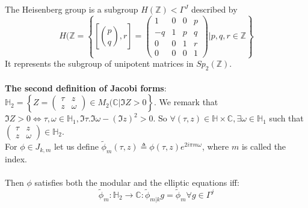 \documentclass[10pt,a4paper]{article}
\begin{document}
The Heisenberg group is a subgroup $H(\mathbb{Z})<\Gamma^J$ described by
\[H(\mathbb{Z}=\left\{\left[\binom{p}{q},r\right]=\left(\begin{array}{cccc} 1&0&0&p\\-q&1&p&q\\0&0&1&r\\0&0&0&1\end{array}\right)|p,q,r\in\mathbb{Z}
\right\}\]
It represents the subgroup of unipotent matrices in $Sp_2(\mathbb{Z})$.\\
\\
\textbf{The second definition of Jacobi forms}:\\
$\mathbb{H}_2=\left\{Z=\left(\begin{array}{cc}\tau&z\\z&\omega\end{array}\right)\in M_2(\mathbb{C}|\Im Z>0\right\}$. We remark that $\Im Z>0\iff \tau,\omega\in\mathbb{H}_1,\Im\tau.\Im\omega-(\Im z)^2>0$. So $\forall (\tau,z)\in\mathbb{H}\times\mathbb{C},\exists\omega\in\mathbb{H}_1$ such that $\left(\begin{array}{cc}\tau&z\\z&\omega\end{array}\right)\in\mathbb{H}_2$.\\
For $\phi\in J_{k,m}$ let us define $\tilde{\phi}_m(\tau,z)\triangleq\phi(\tau,z)e^{2i\pi m\omega}$, where $m$ is called the index.\\
\\
Then $\phi$ satisfies both the modular and the elliptic equations iff:
\[\tilde{\phi}_m:\mathbb{H}_2\rightarrow\mathbb{C}:\tilde{\phi}_{m|k}g=\tilde{\phi}_m\forall g\in\Gamma^j\]
\end{document}
